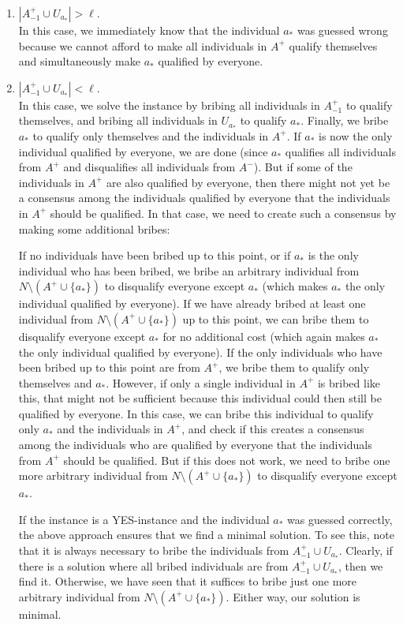 \documentclass[
    12pt,               %
    a4paper,            %
    bibtotoc,           %
    pointlessnumbers,   %
    ngerman,            %
    titlepage,          %
    leqno,              %
    ]{scrarticle}       %
\begin{document}
\begin{Proof}
\begin{enumerate}[
    leftmargin=*,
    label={\textit{Case \ref*{thm:2lic_gb_p}.\arabic*}:},
    ref={\ref*{thm:2lic_gb_p}.\arabic*}
]
\item
$|A^+_{-1} \cup U_{a_\ast}| > \ell$. \\
In this case, we immediately know that the individual $a_\ast$ was guessed wrong because we cannot afford to make all individuals in $A^+$ qualify themselves and simultaneously make $a_\ast$ qualified by everyone.

\item
$|A^+_{-1} \cup U_{a_\ast}| < \ell$. \label{case:2lic_gb_p_easy} \\
In this case, we solve the instance by bribing all individuals in $A^+_{-1}$ to qualify themselves, and bribing all individuals in $U_{a_\ast}$ to qualify $a_\ast$. Finally, we bribe $a_\ast$ to qualify only themselves and the individuals in $A^+$. If $a_\ast$ is now the only individual qualified by everyone, we are done (since $a_\ast$ qualifies all individuals from $A^+$ and disqualifies all individuals from $A^-$). But if some of the individuals in $A^+$ are also qualified by everyone, then there might not yet be a consensus among the individuals qualified by everyone that the individuals in $A^+$ should be qualified. In that case, we need to create such a consensus by making some additional bribes:

If no individuals have been bribed up to this point, or if $a_\ast$ is the only individual who has been bribed, we bribe an arbitrary individual from $N \setminus (A^+ \cup \{a_\ast\})$ to disqualify everyone except $a_\ast$ (which makes $a_\ast$ the only individual qualified by everyone). If we have already bribed at least one individual from $N \setminus (A^+ \cup \{a_\ast\})$ up to this point, we can bribe them to disqualify everyone except $a_\ast$ for no additional cost (which again makes $a_\ast$ the only individual qualified by everyone). If the only individuals who have been bribed up to this point are from $A^+$, we bribe them to qualify only themselves and $a_\ast$. However, if only a single individual in $A^+$ is bribed like this, that might not be sufficient because this individual could then still be qualified by everyone. In this case, we can bribe this individual to qualify only $a_\ast$ and the individuals in $A^+$, and check if this creates a consensus among the individuals who are qualified by everyone that the individuals from $A^+$ should be qualified. But if this does not work, we need to bribe one more arbitrary individual from $N \setminus (A^+ \cup \{a_\ast\})$ to disqualify everyone except $a_\ast$.

If the instance is a YES-instance and the individual $a_\ast$ was guessed correctly, the above approach ensures that we find a minimal solution. To see this, note that it is always necessary to bribe the individuals from $A^+_{-1} \cup U_{a_\ast}$. Clearly, if there is a solution where all bribed individuals are from $A^+_{-1} \cup U_{a_\ast}$, then we find it. Otherwise, we have seen that it suffices to bribe just one more arbitrary individual from $N \setminus (A^+ \cup \{a_\ast\})$. Either way, our solution is minimal.


\end{enumerate}
\end{Proof}
\end{document}
